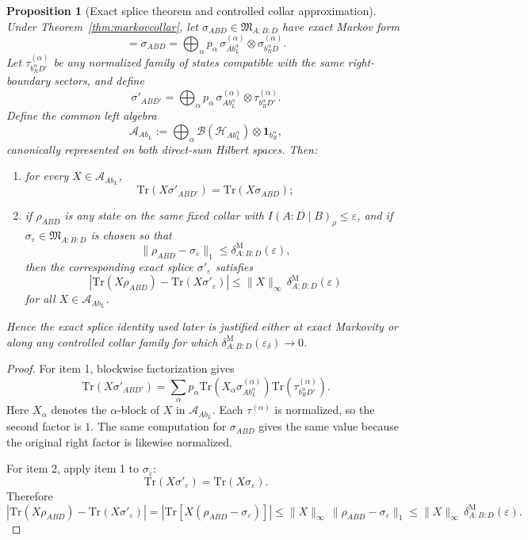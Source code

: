 \documentclass[11pt]{article}
\newtheorem{proposition}[theorem]{Proposition}
\begin{document}
\begin{proposition}[Exact splice theorem and controlled collar approximation]\label{prop:splice}
Under Theorem~\ref{thm:markovcollar}, let \(\sigma_{ABD}\in \mathfrak M_{A:B:D}\) have exact Markov form
\[
=
\sigma_{ABD}
=
\bigoplus_\alpha p_\alpha\,
\sigma^{(\alpha)}_{A b_L^\alpha}\otimes \sigma^{(\alpha)}_{b_R^\alpha D}.
\]
Let \(\tau^{(\alpha)}_{b_R^\alpha D'}\) be any normalized family of states compatible with the same right-boundary sectors, and define
\[
\sigma'_{AB D'}
=
\bigoplus_\alpha p_\alpha\,
\sigma^{(\alpha)}_{A b_L^\alpha}\otimes \tau^{(\alpha)}_{b_R^\alpha D'}.
\]
Define the common left algebra
\[
\mathcal A_{A b_L}:=
\bigoplus_\alpha \mathcal B(\mathcal H_{A b_L^\alpha})\otimes \mathbf 1_{b_R^\alpha},
\]
canonically represented on both direct-sum Hilbert spaces. Then:
\begin{enumerate}[leftmargin=2em]
\item for every \(X\in\mathcal A_{A b_L}\),
\[
\mathrm{Tr}(X\sigma'_{AB D'})=\mathrm{Tr}(X\sigma_{ABD});
\]
\item if \(\rho_{ABD}\) is any state on the same fixed collar with \(I(A:D\mid B)_\rho\le \varepsilon\), and if \(\sigma_\varepsilon\in\mathfrak M_{A:B:D}\) is chosen so that
\[
\|\rho_{ABD}-\sigma_\varepsilon\|_1
\le
\delta^{\mathrm M}_{A:B:D}(\varepsilon),
\]
then the corresponding exact splice \(\sigma'_{\varepsilon}\) satisfies
\[
\left|
\mathrm{Tr}(X\rho_{ABD})-\mathrm{Tr}(X\sigma'_{\varepsilon})
\right|
\le
\|X\|_\infty\,\delta^{\mathrm M}_{A:B:D}(\varepsilon)
\]
for all \(X\in\mathcal A_{A b_L}\).
\end{enumerate}
Hence the exact splice identity used later is justified either at exact Markovity or along any controlled collar family for which \(\delta^{\mathrm M}_{A:B:D}(\varepsilon_\delta)\to 0\).
\end{proposition}

\begin{proof}
For item 1, blockwise factorization gives
\[
\mathrm{Tr}(X\sigma'_{AB D'})
=
\sum_\alpha p_\alpha
\mathrm{Tr}\!\left(X_\alpha\sigma^{(\alpha)}_{A b_L^\alpha}\right)
\mathrm{Tr}\!\left(\tau^{(\alpha)}_{b_R^\alpha D'}\right).
\]
Here \(X_\alpha\) denotes the \(\alpha\)-block of \(X\) in \(\mathcal A_{A b_L}\). Each \(\tau^{(\alpha)}\) is normalized, so the second factor is \(1\). The same computation for \(\sigma_{ABD}\) gives the same value because the original right factor is likewise normalized.

For item 2, apply item 1 to \(\sigma_\varepsilon\):
\[
\mathrm{Tr}(X\sigma'_{\varepsilon})=\mathrm{Tr}(X\sigma_{\varepsilon}).
\]
Therefore
\[
\left|
\mathrm{Tr}(X\rho_{ABD})-\mathrm{Tr}(X\sigma'_{\varepsilon})
\right|
=
\left|
\mathrm{Tr}\!\left[X(\rho_{ABD}-\sigma_{\varepsilon})\right]
\right|
\le
\|X\|_\infty\,\|\rho_{ABD}-\sigma_{\varepsilon}\|_1
\le
\|X\|_\infty\,\delta^{\mathrm M}_{A:B:D}(\varepsilon).
\]
\end{proof}
\end{document}
